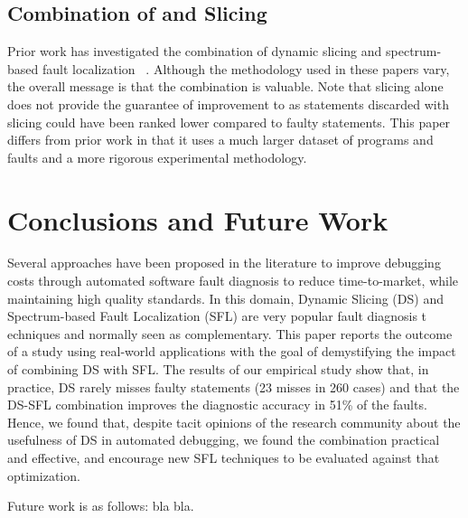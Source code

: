 \documentclass{article}
\begin{document}
\subsection{Combination of \sfl{} and Slicing}

Prior work has investigated the combination of dynamic slicing and
spectrum-based fault
localization ~\cite{Wotawa:2010:FLB:1848650.1849235,Alves:2011:FUD:2190078.2190115,DBLP:conf/ecai/HoferW12,lei-mao-dai-wang-2012,slicing-sfl-repair}. Although
the methodology used in these papers vary, the overall message is that
the combination is valuable. Note that slicing alone does not provide
the guarantee of improvement to \sfl{} as statements discarded with
slicing could have been ranked lower compared to faulty
statements. This paper differs from prior work in that it uses a much
larger dataset of programs and faults and a more rigorous experimental
methodology.
%
\section{Conclusions and Future Work}
\label{sec:conc}
%


Several approaches have been proposed in the literature to improve debugging
costs through automated software fault diagnosis to reduce time-to-market,
while maintaining high quality standards. In this domain, Dynamic Slicing (DS)
and Spectrum-based Fault Localization (SFL) are very popular fault diagnosis t
echniques and normally seen as complementary. This paper reports the outcome of
a study using real-world applications with the goal of demystifying the impact
of combining DS with SFL. The results of our empirical study show that, in
practice, DS rarely misses faulty statements (23 misses in 260 cases) and that
the DS-SFL combination improves the diagnostic accuracy in 51\% of the faults.
Hence, we found that, despite tacit opinions of the research community about
the usefulness of DS in automated debugging, we found the combination practical
and effective, and encourage new SFL techniques to be evaluated against that
optimization.

Future work is as follows: bla bla.

%
{
  \small
  \balance
  
  
}
\end{document}
